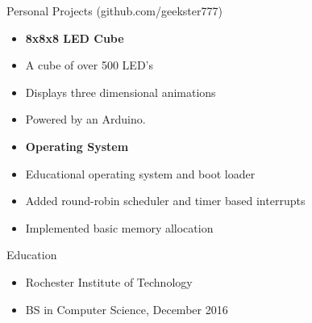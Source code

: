 \documentclass{article}
\newcommand{\lineseparator}[1]{\noindent\makebox[\linewidth]{\rule{\textwidth}{#1}}}
\begin{document}
{\Large Personal Projects (github.com/geekster777) } \\ 
\lineseparator{0.5pt}
\vspace{4mm}
\begin{minipage}[t]{0.5\textwidth}
  \vspace{0.5mm}
  \begin{itemize}[leftmargin=4mm]
    \item[] {\bf 8x8x8 LED Cube } \\[-0.5mm]
    \item[] A cube of over 500 LED's \\[-2mm]
    \item[] Displays three dimensional animations \\[-2mm]
    \item[] Powered by an Arduino.
  \end{itemize}
\end{minipage}
\begin{minipage}[t]{0.5\textwidth}
  \vspace{0.5mm}
  \begin{itemize}[leftmargin=4mm]
    \item[] {\bf Operating System } \\[-0.5mm]
    \item[] Educational operating system and boot loader \\[-2mm]
    \item[] Added round-robin scheduler and timer based interrupts \\[-2mm]
    \item[] Implemented basic memory allocation
  \end{itemize}
\end{minipage}
\begin{minipage}[t]{1.0\textwidth}
  {\Large Education }
\end{minipage}
\lineseparator{0.5pt}
\vspace{4mm}
\begin{minipage}[t]{0.5\textwidth}
  \vspace{0.5mm}
  \begin{itemize}[leftmargin=4mm]
    \item[] Rochester Institute of Technology  \vspace{-2mm}
  \end{itemize}
\end{minipage}
\begin{minipage}[t]{0.5\textwidth}
  \vspace{0.5mm}
  \begin{itemize}[leftmargin=4mm]
    \item[] BS in Computer Science, December 2016 \vspace{-2mm}
  \end{itemize}
\end{minipage}
\end{document}
